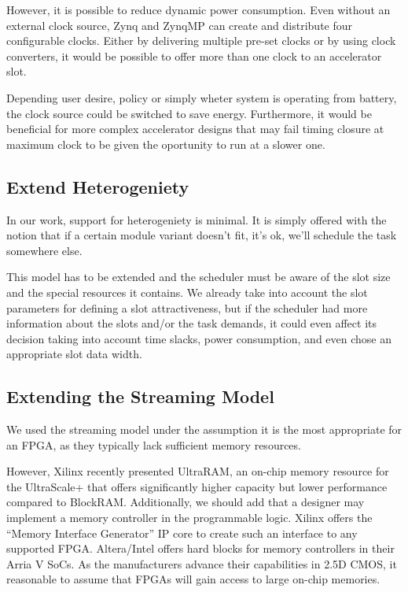 However, it is possible to reduce dynamic power consumption. Even without an external clock source, Zynq and ZynqMP can create and distribute
four configurable clocks. Either by delivering multiple pre-set clocks or by using clock converters, it would be possible to offer more than
one clock to an accelerator slot. 

Depending user desire, policy or simply wheter system is operating from battery, the clock source could be switched to save energy.
Furthermore, it would be beneficial for more complex accelerator designs that may fail timing closure at maximum clock
to be given the oportunity to run at a slower one.

\subsection{Extend Heterogeniety}

In our work, support for heterogeniety is minimal. 
It is simply offered with the notion that if a certain module variant doesn't fit, it's ok, we'll schedule the task somewhere else.

This model has to be extended and the scheduler must be aware of the slot size and the special resources it contains.
We already take into account the slot parameters for defining a slot attractiveness, but if the scheduler had more information
about the slots and/or the task demands, it could even affect its decision taking into account time slacks, power consumption,
and even chose an appropriate slot data width.


\subsection{Extending the Streaming Model}

We used the streaming model under the assumption it is the most appropriate for an FPGA, 
as they typically lack sufficient memory resources.

However, Xilinx recently presented UltraRAM, an on-chip memory resource for the UltraScale+
that offers significantly higher capacity but lower performance compared to BlockRAM. 
Additionally, we should add that a designer may implement a memory controller in the programmable logic.
Xilinx offers the ``Memory Interface Generator'' IP core to create such an interface to any supported FPGA.
Altera/Intel offers hard blocks for memory controllers in their Arria V SoCs.
As the manufacturers advance their capabilities in 2.5D CMOS, it reasonable to assume that FPGAs will
gain access to large on-chip memories. 

